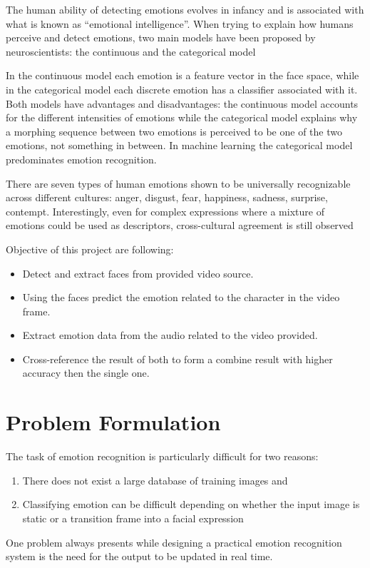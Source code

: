 The human ability of detecting emotions evolves in infancy and is associated with what is known as “emotional intelligence”. When trying to explain how humans perceive and detect emotions, two main models have been proposed by neuroscientists: the continuous and the categorical model

In the continuous model each emotion is a feature vector in the face space, while in the categorical model each discrete emotion has a classifier associated with it. Both models have advantages and disadvantages: the continuous model accounts for the different intensities of emotions while the categorical model explains why a morphing sequence between two emotions is perceived to be one of the two emotions, not something in between. In machine learning the categorical model predominates emotion recognition.

There are seven types of human emotions shown to be universally recognizable across different cultures: anger, disgust, fear, happiness, sadness, surprise, contempt. Interestingly, even for complex expressions where a mixture of emotions could be used as descriptors, cross-cultural agreement is still observed

\vskip 0.5cm
Objective of this project are following:
\begin{itemize}
	\item Detect and extract faces from provided video source.
	\item Using the faces predict the emotion related to the character in the video frame.
	\item Extract emotion data from the audio related to the video provided.
	\item Cross-reference the result of both to form a combine result with higher accuracy then the single one.
\end{itemize}

\section{Problem Formulation}
The task of emotion recognition is particularly difficult for two reasons:
\begin{enumerate}
	\item There does not exist a large database of training images and
	\item Classifying emotion can be difficult depending on whether the input image is static or a transition frame into a facial expression
\end{enumerate}
One problem always presents while designing a practical emotion recognition system is the need for the output to be updated in real time.

